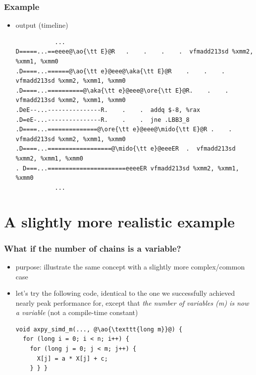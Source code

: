 \documentclass[12pt,dvipdfmx]{beamer}
\newcommand{\mido}[1]{{\color{green!40!black}#1}}
\newcommand{\ore}[1]{{\color{orange}#1}}
\newcommand{\ao}[1]{{\color{blue}#1}}
\newcommand{\aka}[1]{{\color{red}#1}}
\begin{document}
\begin{frame}[fragile]
  \frametitle{Example}
  \begin{itemize}
\item output (timeline)
{\tiny
\begin{lstlisting}
           ...
D=====...==eeee@\ao{\tt E}@R   .    .    .    .  vfmadd213sd %xmm2, %xmm1, %xmm0
.D====...======@\ao{\tt e}@eee@\aka{\tt E}@R    .    .    .  vfmadd213sd %xmm2, %xmm1, %xmm0
.D====...==========@\aka{\tt e}@eee@\ore{\tt E}@R.    .    .  vfmadd213sd %xmm2, %xmm1, %xmm0
.DeE--...---------------R.    .    .  addq $-8, %rax
.D=eE-...---------------R.    .    .  jne .LBB3_8
.D====...==============@\ore{\tt e}@eee@\mido{\tt E}@R .    .  vfmadd213sd %xmm2, %xmm1, %xmm0
.D====...==================@\mido{\tt e}@eeeER  .  vfmadd213sd %xmm2, %xmm1, %xmm0
. D===...======================eeeeER vfmadd213sd %xmm2, %xmm1, %xmm0
           ...
\end{lstlisting}%
}
\end{itemize}
\end{frame}


\iffalse
\section{A slightly more realistic example}

\begin{frame}[fragile]
\frametitle{What if the number of chains is a variable?}
\begin{itemize}
\item purpose: illustrate the same concept with a slightly
  more complex/common case
  
\item let's try the following code, identical to the one we
  successfully achieved nearly peak performance for,
  except that \ao{\it the number of variables (m) is now a
  variable} (not a compile-time constant)
\begin{lstlisting}
void axpy_simd_m(..., @\ao{\texttt{long m}}@) { 
  for (long i = 0; i < n; i++) {
    for (long j = 0; j < m; j++) {
      X[j] = a * X[j] + c;
    } } }
\end{lstlisting}

\end{itemize}
\end{frame}
\end{document}
